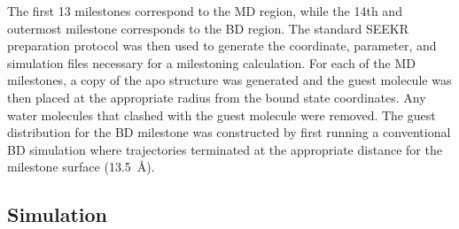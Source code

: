 \par The first 13 milestones correspond to the MD region, while the 14th and 
outermost milestone corresponds to the BD region. The standard SEEKR preparation 
protocol\cite{Votapka2017} was then used to generate the coordinate, parameter, 
and simulation files necessary for a milestoning calculation. For each of the MD 
milestones, a copy of the apo \bcd structure was generated and the guest 
molecule was then placed at the appropriate radius from the bound state coordinates. 
Any water molecules that clashed with the guest molecule were removed. The guest 
distribution for the BD milestone was constructed by first running a conventional 
BD simulation where trajectories terminated at the appropriate distance for the 
milestone surface (13.5~\AA).

\subsection*{Simulation}
